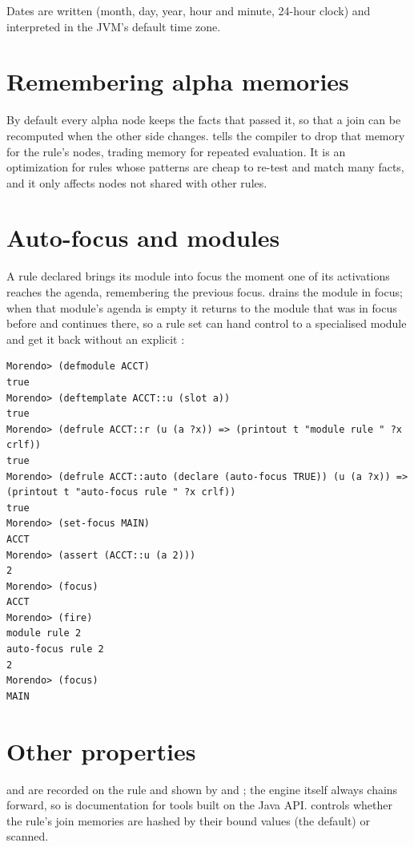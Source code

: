Dates are written  (month, day, year, hour and
minute, 24-hour clock) and interpreted in the JVM's default time zone.

\section{Remembering alpha memories}

By default every alpha node keeps the facts that passed it, so that a
join can be recomputed when the other side changes.  tells the compiler to drop that memory for the rule's nodes,
trading memory for repeated evaluation. It is an optimization for rules
whose patterns are cheap to re-test and match many facts, and it only
affects nodes not shared with other rules.

\section{Auto-focus and modules}
\label{sec:auto-focus}

A rule declared  brings its module into focus the
moment one of its activations reaches the agenda, remembering the
previous focus.  drains the module in focus; when that module's
agenda is empty it returns to the module that was in focus before and
continues there, so a rule set can hand control to a specialised module
and get it back without an explicit :

\begin{lstlisting}[style=shell]
Morendo> (defmodule ACCT)
true
Morendo> (deftemplate ACCT::u (slot a))
true
Morendo> (defrule ACCT::r (u (a ?x)) => (printout t "module rule " ?x crlf))
true
Morendo> (defrule ACCT::auto (declare (auto-focus TRUE)) (u (a ?x)) => (printout t "auto-focus rule " ?x crlf))
true
Morendo> (set-focus MAIN)
ACCT
Morendo> (assert (ACCT::u (a 2)))
2
Morendo> (focus)
ACCT
Morendo> (fire)
module rule 2
auto-focus rule 2
2
Morendo> (focus)
MAIN
\end{lstlisting}

\section{Other properties}

 and  are recorded on the rule
and shown by  and ; the engine itself always
chains forward, so  is documentation for tools
built on the Java API.  controls whether the rule's
join memories are hashed by their bound values (the default) or scanned.

